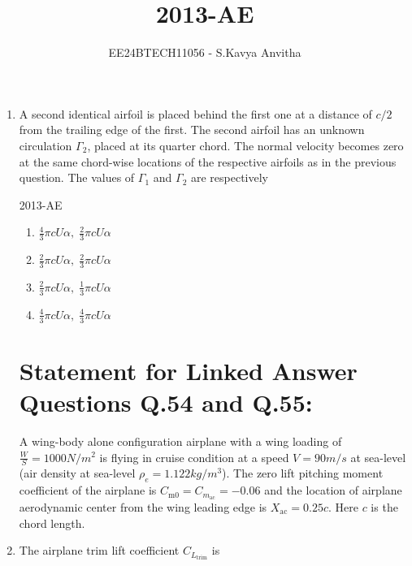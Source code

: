 \documentclass[journal]{IEEEtran}
\newcommand{\questionref}[1]{{ #1}}
\begin{document}

\vspace{3cm}

\title{2013-AE}
\author{EE24BTECH11056 - S.Kavya Anvitha}
\maketitle
\bigskip

\renewcommand{\thefigure}{\theenumi}
\renewcommand{\thetable}{\theenumi}
\begin{enumerate}

\item A second identical airfoil is placed behind the first one at a distance of $c/2$ from the trailing edge of the first. The second airfoil has an unknown circulation $\Gamma_2$, placed at its quarter chord. The normal velocity becomes zero at the same chord-wise locations of the respective airfoils as in the previous question. The values of $\Gamma_1$ and $\Gamma_2$ are respectively
	
\hfill{2013-AE}

\begin{enumerate}
    \item $\frac{4}{3} \pi c U \alpha, \; \frac{2}{3} \pi c U \alpha$
    \item $\frac{2}{3} \pi c U \alpha, \; \frac{2}{3} \pi c U \alpha$
    \item $\frac{2}{3} \pi c U \alpha, \; \frac{1}{3} \pi c U \alpha$
    \item $\frac{4}{3} \pi c U \alpha, \; \frac{4}{3} \pi c U \alpha$
\end{enumerate}

\section{Statement for Linked Answer Questions \questionref{Q.54} and \questionref{Q.55}:} A wing-body alone configuration airplane with a wing loading of $\frac{W}{S} = 1000N/m^2$ is flying in cruise condition at a speed $V = 90m/s$ at sea-level (air density at sea-level $\rho_e = 1.122kg/m^3$). The zero lift pitching moment coefficient of the airplane is $C_{\text{m0}} = C_{m_{\text{ac}}} = -0.06$ and the location of airplane aerodynamic center from the wing leading edge is $X_{\text{ac}} = 0.25c$. Here $c$ is the chord length.

\item \label{q54}The airplane trim lift coefficient $C_{L_{\text{trim}}}$ is


\end{enumerate}
\end{document}
